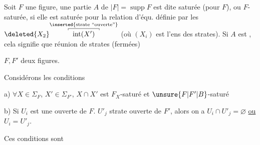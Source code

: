 Soit $F$ une figure, une partie  $A$ de $\lvert F\rvert=\operatorname{supp} F$ est dite saturée (pour $F$), ou $F$-saturée, si elle est saturée pour la relation d'équ. définie par les $\deleted{X_2}\overset{\substack{\relax\inserted{\text{strate ``ouverte''}}\\[-.45ex]\raisebox{-.5ex}{\rule{.4pt}{.6ex}}\rule{4.4em}{.4pt}\raisebox{-.5ex}{\rule{.4pt}{.6ex}}}}{\operatorname{int}(X')}$ (où $(X_i)$ est l'ens des strates). Si $A$ est , cela signifie que  réunion de strates (fermées)

 $F,F'$ deux figures.

Considérons les conditions


a) $\forall X\in\Sigma_F$, $X'\in\Sigma_{F'}$, $X\cap X'$ est  $F_X$-saturé  et $\unsure{F|F'|B}$-saturé





b) Si $U_i$ est une  ouverte de $F$. $U'_j$ strate ouverte de $F'$, alors on a $U_i\cap U'_j=\varnothing$ \uline{ou} $U_i=U'_j$.

Ces conditions sont 



